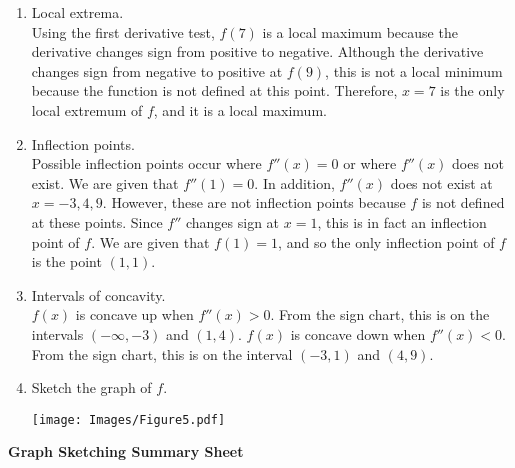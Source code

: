 \documentclass[handout,nooutcomes]{ximera}
\renewenvironment{freeResponse}{
\ifhandout\setbox0\vbox\bgroup\else
\begin{trivlist}\item[\hskip \labelsep\bfseries Solution:\hspace{2ex}]
\fi}
{\ifhandout\egroup\else
\end{trivlist}
\fi}
\newcommand{\dfn}{\textbf}
\begin{document}
\begin{problem}
\begin{freeResponse}
\begin{enumerate}
      \item
        Local extrema.  \\
        Using the first derivative test, $f(7)$ is a local maximum because the derivative changes sign from positive to negative.
        Although the derivative changes sign from negative to positive at $f(9)$, this is not a local minimum because the function is not defined at this point.
        Therefore, $x=7$ is the only local extremum of $f$, and it is a local maximum.
			
      \item
        Inflection points.  \\
        Possible inflection points occur where $f''(x)=0$ or where $f''(x)$ does not exist.
        We are given that $f''(1)=0$.
        In addition, $f''(x)$ does not exist at $x=-3,4,9$.
        However, these are not inflection points because $f$ is not defined at these points.
        Since $f''$ changes sign at $x=1$, this is in fact an inflection point of $f$.
        We are given that $f(1) = 1$, and so the only inflection point of $f$ is the point $(1,1)$.  
			
      \item
        Intervals of concavity.  \\
        $f(x)$ is concave up when $f''(x)>0$.
        From the sign chart, this is on the intervals $(-\infty ,-3)$ and $(1,4)$.
        $f(x)$ is concave down when $f''(x)<0$.
        From the sign chart, this is on the interval $(-3,1)$ and $(4,9)$.
        
			
      \item
        Sketch the graph of $f$.
        \begin{image}
          \texttt{[image: Images/Figure5.pdf]}
	\end{image}
    \end{enumerate}
  \end{freeResponse}
\end{problem}
\newpage
\begin{center}  \dfn{Graph Sketching Summary Sheet}  \end{center}
\end{document}
